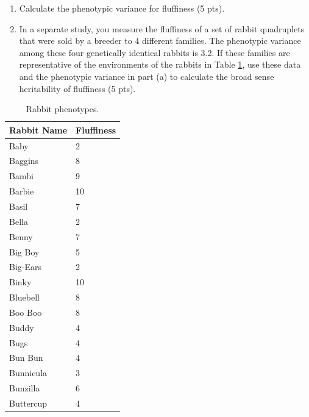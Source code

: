 \documentclass[]{article}
\begin{document}
\begin{enumerate}
\begin{enumerate}
\item Calculate the phenotypic variance for fluffiness (5 pts).
\item In a separate study, you measure the fluffiness of a set of rabbit quadruplets that were sold by a breeder to 4 different families.  The phenotypic variance among these four genetically identical rabbits is 3.2. If these families are representative of the environments of the rabbits in Table \ref{fluffy}, use these data and the phenotypic variance in part (a) to calculate the broad sense heritability of fluffiness (5 pts).

\end{enumerate}

\begin{table}[h]
\caption[]{Rabbit phenotypes.}
\begin{center}
\begin{tabular}{ll}
Rabbit Name & Fluffiness \\  \hline
Baby & 2\\
Baggins & 8\\
Bambi & 9\\
Barbie & 10\\
Basil & 7\\
Bella & 2\\
Benny & 7\\
Big Boy & 5\\
Big-Ears & 2\\
Binky & 10\\
Bluebell & 8\\
Boo Boo & 8\\
Buddy & 4\\
Bugs & 4\\
Bun Bun & 4\\
Bunnicula & 3\\
Bunzilla & 6\\
Buttercup & 4\\
\end{tabular}
\end{center}
\label{fluffy}
\end{table}



\end{enumerate}
\end{document}
